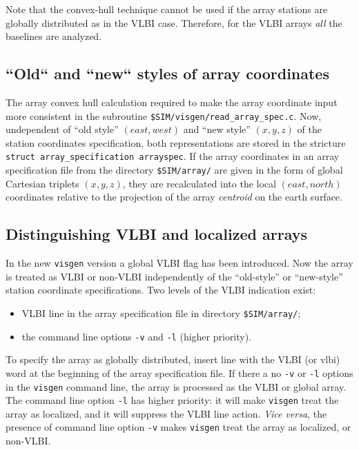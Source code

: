 \documentclass[letterpaper, oneside, 11pt]{article}
\begin{document}
Note that the convex-hull technique cannot be used if the array stations are globally distributed as in the VLBI case. Therefore, for the VLBI arrays \emph{all} the baselines are analyzed. \\

\subsection{``Old`` and ``new`` styles of array coordinates}

The array convex hull calculation required to make the array coordinate input more consistent in the subroutine {\tt \$SIM/visgen/read\_array\_spec.c}. Now, undependent of ``old style'' $(east,west)$ and ``new style'' $(x,y,z)$ of the station coordinates specification, both representations are stored in the stricture {\tt struct array\_specification arrayspec}. If the array coordinates in an array specification file from the directory {\tt \$SIM/array/} are given in the form of global Cartesian triplets $(x,y,z)$, they are recalculated into the local $(east,north)$ coordinates relative to the projection of the array \emph{centroid} on the earth surface. \\
  
\subsection{Distinguishing VLBI and localized arrays}

In the new {\tt visgen} version a global VLBI flag has been introduced. Now the array is treated as VLBI or non-VLBI independently of the ``old-style'' or ``new-style'' station coordinate specifications. Two levels of the VLBI indication exist:
\begin{itemize}
 \item VLBI line in the array specification file in directory {\tt \$SIM/array/};
 \item the command line options {\tt -v} and {\tt -l} (higher priority).
\end{itemize}
To specify the array as globally distributed, insert line with the VLBI (or vlbi) word at the beginning of the array specification file. If there a no {\tt -v} or {\tt -l} options in the {\tt visgen} command line, the array is processed as the VLBI or global array. \\

The command line option {\tt -l} has higher priority: it will make {\tt visgen} treat the array as localized, and it will suppress the VLBI line action. \emph{Vice versa}, the presence of command line option {\tt -v} makes {\tt visgen} treat the array as localized, or non-VLBI. \\ 
\end{document}
